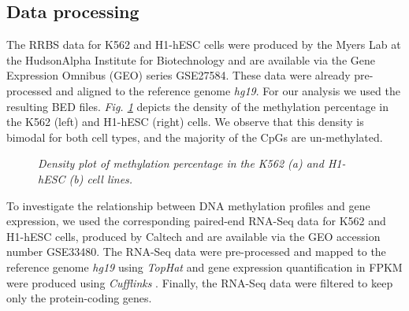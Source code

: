 \subsection{Data processing} \label{meth-encode-data-subsect}
The RRBS data for K562 and H1-hESC cells were produced by the Myers Lab at the HudsonAlpha Institute for Biotechnology and are available via the Gene Expression Omnibus (GEO) series GSE27584. These data were already pre-processed and aligned to the reference genome \emph{hg19}. For our analysis we used the resulting BED files. \emph{Fig. \ref{meth-dens-pic}} depicts the density of the methylation percentage in the K562 (left) and H1-hESC (right) cells. We observe that this density is bimodal for both cell types, and the majority of the CpGs are un-methylated. 

\begin{figure}[ht!]
     \begin{center}
    \end{center}
    \caption{\emph{Density plot of methylation percentage in the K562 (a) and H1-hESC (b) cell lines.}}
   \label{meth-dens-pic}
\end{figure}

To investigate the relationship between DNA methylation profiles and gene expression, we used the corresponding paired-end RNA-Seq data for K562 and H1-hESC cells, produced by Caltech and are available via the GEO accession number GSE33480. The RNA-Seq data were pre-processed and mapped to the reference genome \emph{hg19} using \emph{TopHat} \citep{Trapnell2009} and gene expression quantification in FPKM were produced using \emph{Cufflinks} \citep{Trapnell2010}. Finally, the RNA-Seq data were filtered to keep only the protein-coding genes. 

